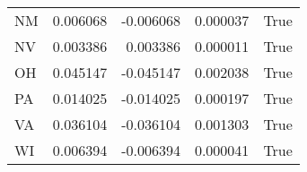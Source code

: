 \begin{table}
\begin{tabular}{lrrrl}
      NM &   0.006068 & -0.006068 &       0.000037 &          True \\
      NV &   0.003386 &  0.003386 &       0.000011 &          True \\
      OH &   0.045147 & -0.045147 &       0.002038 &          True \\
      PA &   0.014025 & -0.014025 &       0.000197 &          True \\
      VA &   0.036104 & -0.036104 &       0.001303 &          True \\
      WI &   0.006394 & -0.006394 &       0.000041 &          True \\
\bottomrule
\end{tabular}
\end{table}
